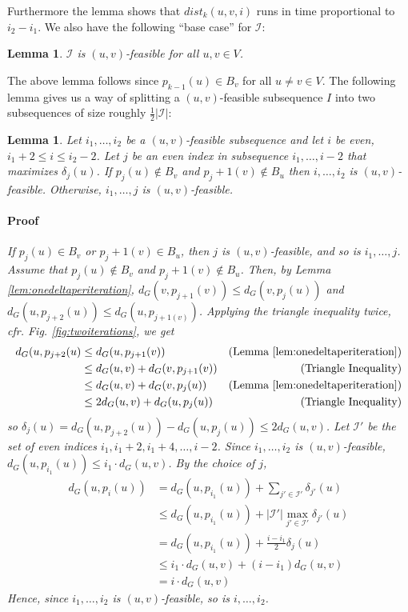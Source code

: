 \documentclass[12pt]{article}
\newtheorem{lem}[thm]{Lemma}
\begin{document}
Furthermore the lemma shows that $dist_k(u,v,i)$ runs in time proportional to $i_2-i_1$. We also have the following ``base case'' for $\mathcal{I}$:
\\
\begin{lem}
$\mathcal{I}$ is $(u,v)$-feasible for all $u,v \in V$. \label{lem:basecase}
\end{lem}
The above lemma follows since $p_{k-1}(u) \in B_v$ for all $u \not= v \in V$. The following lemma gives us a way of splitting a $(u,v)$-feasible subsequence $I$ into two subsequences of size roughly $\frac{1}{2}|\mathcal{I}|$:
\\
\begin{lem}
Let $i_1, \hdots, i_2$ be a $(u,v)$-feasible subsequence and let $i$ be even, $i_1+2 \leq i \leq i_2-2$. Let $j$ be an even index in subsequence $i_1, \hdots ,i-2$ that maximizes $\delta_j(u)$. If $p_j(u) \not\in B_v$ and $p_j+1(v) \not\in B_u$ then $i, \hdots , i_2$ is $(u,v)$-feasible. Otherwise, $i_1, \hdots , j$ is $(u,v)$-feasible.

\paragraph{Proof} If $p_j(u) \in B_v$ or $p_j+1(v) \in B_u$, then $j$ is $(u,v)$-feasible, and so is $i_1, \hdots, j$. Assume that $p_j(u) \not\in B_v$ and $p_j+1(v) \not\in B_u$. Then, by Lemma \ref{lem:onedeltaperiteration}, $d_G(v,p_{j+1}(v)) \leq d_G(v,p_{j}(u))$ and $d_G(u,p_{j+2}(u)) \leq d_G(u,p_{j+1(v)})$. Applying the triangle inequality twice, cfr. Fig. \ref{fig:twoiterations}, we get 
\begin{align*}
d_G(u,p_{j+2}(u) &\leq d_G(u,p_{j+1}(v)) &(\text{Lemma \ref{lem:onedeltaperiteration}}) \\
&\leq d_G(u,v) + d_G(v, p_{j+1}(v)) &(\text{Triangle Inequality})\\
&\leq d_G(u,v) + d_G(v, p_{j}(u)) &(\text{Lemma \ref{lem:onedeltaperiteration}})\\
&\leq 2d_G(u,v) + d_G(u, p_{j}(u))&(\text{Triangle Inequality})
\end{align*}
so $\delta_j(u) = d_G(u,p_{j+2}(u)) - d_G(u,p_j(u)) \leq 2d_G(u,v)$. Let $\mathcal{I}'$ be the set of even indices $i_1, i_1+2, i_1+4, \hdots, i-2$. Since $i_1, \hdots, i_2$ is $(u,v)$-feasible, $d_G(u,p_{i_1}(u)) \leq i_1 \cdot d_G(u,v)$. By the choice of $j$,
\begin{align*}
d_G(u,p_{i}(u)) &= d_G(u,p_{i_1}(u)) + \sum_{j' \in \mathcal{I'}}\delta_{j'}(u) \\
&\leq d_G(u,p_{i_1}(u)) + \left| \mathcal{I'} \right| \max_{j' \in \mathcal{I'}}\delta_{j'}(u) \\
&= d_G(u,p_{i_1}(u)) + \frac{i-i_1}{2} \delta_{j}(u) \\
&\leq i_1 \cdot d_G(u,v) + (i-i_1)d_G(u,v) \\
&= i \cdot d_G(u,v)
\end{align*}
Hence, since $i_1, \hdots, i_2$ is $(u,v)$-feasible, so is $i, \hdots, i_2$.  \label{lem:uvfeasibility}
\end{lem}
\end{document}
